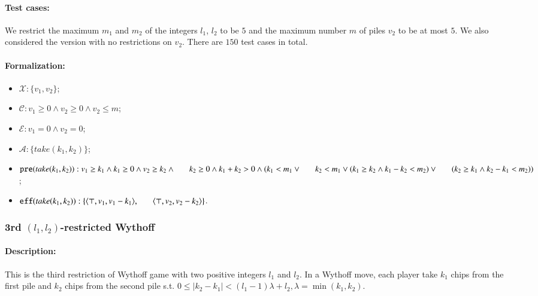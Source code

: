 \documentclass[review]{elsarticle}
\newcommand{\set}[1]{\{ #1 \}}
\newcommand{\tuple}[1]{\langle {#1} \rangle}
\newcommand{\true}{\top}
\newcommand{\statevar}{\mathcal{X}}
\newcommand{\act}{\mathcal{A}}
\newcommand{\constraint}{\mathcal{C}}
\newcommand{\estate}{\mathcal{E}}
\newcommand{\pre}{\mathtt{pre}}
\newcommand{\eff}{\mathtt{eff}}
\begin{document}
\paragraph{Test cases:}
We restrict the maximum $m_1$ and $m_2$ of the integers $l_1$, $l_2$ to be $5$ and the maximum number $m$ of piles $v_2$ to be at most $5$.
We also considered the version with no restrictions on $v_2$.
There are $150$ test cases in total.


\paragraph{Formalization:}
\begin{itemize}
	\item $\statevar:\set{v_1, v_2}$;
	\item $\constraint: v_1 \ge 0 \wedge v_2 \ge 0 \wedge v_2 \le m$;
	\item $\estate: v_1 = 0 \wedge v_2 = 0$;
	\item $\act:\set{take(k_1, k_2)}$;
	\item $\pre(take(k_1, k_2)) : v_1 \ge k_1 \wedge  k_1 \ge 0 \wedge v_2 \ge k_2 \wedge \\ \hspace*{6mm}
	k_2 \ge 0 \wedge  k_1 + k_2 > 0 \wedge ( k_1 < m_1 \vee \\ \hspace*{6mm}
	k_2 < m_1 \vee (k_1\ge k_2 \wedge k_1 - k_2 < m_2) \vee \\ 	\hspace*{6mm}
	(k_2\ge k_1 \wedge k_2 - k_1 < m_2))$;
	\item $\eff(take(k_1, k_2)) : \set{\tuple{\true, v_1, v_1 -k_1}, \\ \hspace*{6mm}
		\tuple{\true, v_2, v_2 - k_2}}$.
\end{itemize}



\subsubsection{3rd $(l_1,l_2)$-restricted Wythoff \protect\cite{LiuL2014}}

\paragraph{Description:}
This is the third restriction of Wythoff game with two positive integers $l_1$ and $l_2$.
In a Wythoff move, each player take $k_1$ chips from the first pile and $k_2$ chips from the second pile s.t. $0 \le |k_2 - k_1| < (l_1 - 1) \lambda + l_2, \lambda = \min (k_1, k_2)$.
\end{document}
